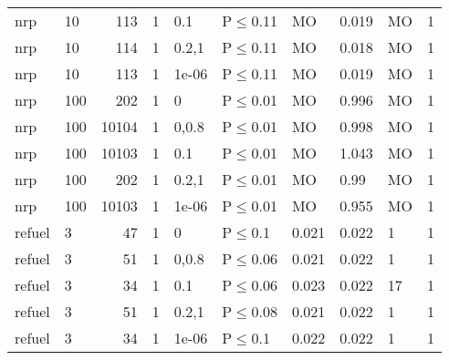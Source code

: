 \begin{longtable}{llrrllllll}
 nrp           & 10       &    	113 & 1 & 0.1   & P$\leq$0.11  & MO     & 0.019   & MO      & 1    \\
 nrp           & 10       &    	114 & 1 & 0.2,1 & P$\leq$0.11  & MO     & 0.018   & MO      & 1    \\
 nrp           & 10       &    	113 & 1 & 1e-06 & P$\leq$0.11  & MO     & 0.019   & MO      & 1    \\
 nrp           & 100      &    	202 & 1 & 0     & P$\leq$0.01  & MO     & 0.996   & MO      & 1    \\
 nrp           & 100      &  	10104 & 1 & 0,0.8 & P$\leq$0.01  & MO     & 0.998   & MO      & 1    \\
 nrp           & 100      &  	10103 & 1 & 0.1   & P$\leq$0.01  & MO     & 1.043   & MO      & 1    \\
 nrp           & 100      &    	202 & 1 & 0.2,1 & P$\leq$0.01  & MO     & 0.99    & MO      & 1    \\
 nrp           & 100      &  	10103 & 1 & 1e-06 & P$\leq$0.01  & MO     & 0.955   & MO      & 1    \\
 refuel        & 3        &     	47 & 1 & 0     & P$\leq$0.1   & 0.021  & 0.022   & 1       & 1    \\
 refuel        & 3        &     	51 & 1 & 0,0.8 & P$\leq$0.06  & 0.021  & 0.022   & 1       & 1    \\
 refuel        & 3        &     	34 & 1 & 0.1   & P$\leq$0.06  & 0.023  & 0.022   & 17      & 1    \\
 refuel        & 3        &     	51 & 1 & 0.2,1 & P$\leq$0.08  & 0.021  & 0.022   & 1       & 1    \\
 refuel        & 3        &     	34 & 1 & 1e-06 & P$\leq$0.1   & 0.022  & 0.022   & 1       & 1    \\
\bottomrule
\end{longtable}
